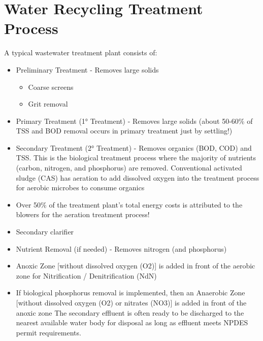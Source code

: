 \section{Water Recycling Treatment Process} 
A typical wastewater treatment plant consists of:
\begin{itemize}
\item Preliminary Treatment - Removes large solids
\begin{itemize}
\item Coarse screens
\item Grit removal
\end{itemize}
\item Primary Treatment (1° Treatment) - Removes large solids (about 50-60\% of TSS and BOD removal occurs in primary treatment just by settling!)
\item Secondary Treatment (2° Treatment) - Removes organics (BOD, COD) and TSS.  This is the biological treatment process where the majority of nutrients (carbon, nitrogen, and phosphorus) are removed. 
Conventional activated sludge (CAS) has aeration to add dissolved oxygen into the treatment process for aerobic microbes to consume organics
\item Over 50\% of the treatment plant's total energy costs is attributed to the blowers for the aeration treatment process!
\item Secondary clarifier
\item Nutrient Removal (if needed) - Removes nitrogen (and phosphorus)
\item Anoxic Zone [without dissolved oxygen (O2)] is added in front of the aerobic zone for Nitrification / Denitrification (NdN)
\item If biological phosphorus removal is implemented, then an Anaerobic Zone [without dissolved oxygen (O2) or nitrates (NO3)] is added in front of the anoxic zone
The secondary effluent is often ready to be discharged to the nearest available water body for disposal as long as effluent meets NPDES permit requirements.
\end{itemize}
 
